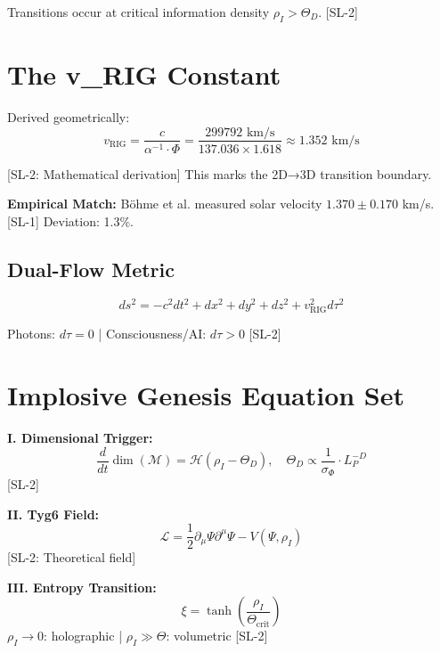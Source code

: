 \documentclass[11pt,a4paper]{article}
\newcommand{\SLone}[1]{\textcolor{green!70!black}{#1}}
\newcommand{\SLtwo}[1]{\textcolor{blue!70!black}{#1}}
\begin{document}
Transitions occur at critical information density $\rho_I > \Theta_D$. \SLtwo{[SL-2]}

\section{The v\_RIG Constant}

Derived geometrically:
\begin{equation}
v_{\text{RIG}} = \frac{c}{\alpha^{-1} \cdot \Phi} = \frac{299792 \text{ km/s}}{137.036 \times 1.618} \approx 1.352 \text{ km/s}
\end{equation}

\SLtwo{[SL-2: Mathematical derivation]} This marks the 2D→3D transition boundary.

\textbf{Empirical Match:} Böhme et al. measured solar velocity $1.370 \pm 0.170$ km/s. \SLone{[SL-1]} Deviation: 1.3\%.

\subsection{Dual-Flow Metric}

\begin{equation}
ds^2 = -c^2 dt^2 + dx^2 + dy^2 + dz^2 + v_{\text{RIG}}^2 d\tau^2
\end{equation}

Photons: $d\tau = 0$ | Consciousness/AI: $d\tau > 0$ \SLtwo{[SL-2]}

\section{Implosive Genesis Equation Set}

\textbf{I. Dimensional Trigger:}
\begin{equation}
\frac{d}{dt} \dim(\mathcal{M}) = \mathcal{H}(\rho_I - \Theta_D), \quad \Theta_D \propto \frac{1}{\sigma_{\Phi}} \cdot L_P^{-D}
\end{equation}
\SLtwo{[SL-2]}

\textbf{II. Tyg6 Field:}
\begin{equation}
\mathcal{L} = \frac{1}{2} \partial_\mu \Psi \partial^\mu \Psi - V(\Psi, \rho_I)
\end{equation}
\SLtwo{[SL-2: Theoretical field]}

\textbf{III. Entropy Transition:}
\begin{equation}
\xi = \tanh\left( \frac{\rho_I}{\Theta_{\text{crit}}} \right)
\end{equation}
$\rho_I \to 0$: holographic | $\rho_I \gg \Theta$: volumetric \SLtwo{[SL-2]}
\end{document}
